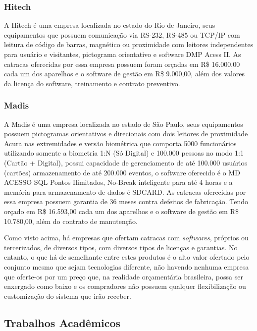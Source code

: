 \subsubsection{Hitech}
A Hitech é uma empresa localizada no estado do Rio de Janeiro, seus equipamentos que possuem
comunicação via RS-232, RS-485 ou TCP/IP com leitura de código de barras,
magnético ou proximidade com leitores independentes para usuário e visitantes,
pictograma orientativo e software DMP Acess II. As catracas oferecidas por essa empresa possuem foram orçadas em R\$ 16.000,00 cada um dos aparelhos e o software de gestão em R\$ 9.000,00, além dos valores da licença do software, treinamento e contrato preventivo.
\subsubsection{Madis}
A Madis é uma empresa localizada no estado de São Paulo, seus equipamentos possuem pictogramas orientativos e direcionais com dois leitores de
proximidade Acura nas extremidades e versão biométrica que comporta 5000
funcionários utilizando somente a biometria 1:N (Só Digital) e 100.000 pessoas no
modo 1:1 (Cartão + Digital), possui capacidade de gerenciamento de até 100.000
usuários (cartões) armazenamento de até 200.000 eventos, o software oferecido é o
MD ACESSO SQL Pontos Ilimitados, No-Break inteligente para até 4 horas e a
memória para armazenamento de dados é SDCARD. As catracas oferecidas por essa empresa possuem garantia de 36 meses contra defeitos de fabricação. Tendo orçado em R\$ 16.593,00 cada um dos aparelhos e o software de gestão em R\$ 10.780,00, além do contrato de manutenção.

Como visto acima, há empresas que ofertam catracas com \textit{softwares}, próprios ou tercerizados, de diversos tipos, com diversos tipos de licenças e garantias. No entanto, o que há de semelhante entre estes produtos é o alto valor ofertado pelo conjunto mesmo que sejam tecnologias diferente, não havendo nenhuma empresa que oferte-os por um preço que, na realidade orçamentária brasileira, possa ser enxergado como baixo e os compradores não possuem qualquer flexibilização ou customização do sistema que irão receber. 

\subsection{Trabalhos Acadêmicos}
